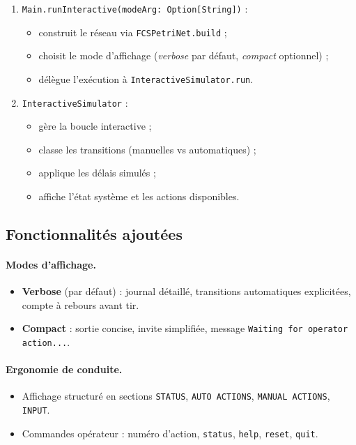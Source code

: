 \documentclass[11pt,a4paper]{article}
\newcommand{\code}[1]{\texttt{#1}}
\begin{document}
\begin{enumerate}[leftmargin=1.2cm,itemsep=2pt]
  \item \code{Main.runInteractive(modeArg: Option[String])} :
  \begin{itemize}[leftmargin=1.0cm,itemsep=1pt]
    \item construit le réseau via \code{FCSPetriNet.build} ;
    \item choisit le mode d'affichage (\emph{verbose} par défaut,
          \emph{compact} optionnel) ;
    \item délègue l'exécution à \code{InteractiveSimulator.run}.
  \end{itemize}
  \item \code{InteractiveSimulator} :
  \begin{itemize}[leftmargin=1.0cm,itemsep=1pt]
    \item gère la boucle interactive ;
    \item classe les transitions (manuelles vs automatiques) ;
    \item applique les délais simulés ;
    \item affiche l'état système et les actions disponibles.
  \end{itemize}
\end{enumerate}

\subsection{Fonctionnalités ajoutées}

\paragraph{Modes d'affichage.}
\begin{itemize}[leftmargin=1.2cm,itemsep=1pt]
  \item \textbf{Verbose} (par défaut) : journal détaillé, transitions
        automatiques explicitées, compte à rebours avant tir.
  \item \textbf{Compact} : sortie concise, invite simplifiée, message
        \code{Waiting for operator action...}.
\end{itemize}

\paragraph{Ergonomie de conduite.}
\begin{itemize}[leftmargin=1.2cm,itemsep=1pt]
  \item Affichage structuré en sections \code{STATUS}, \code{AUTO ACTIONS},
        \code{MANUAL ACTIONS}, \code{INPUT}.
  \item Commandes opérateur : numéro d'action, \code{status}, \code{help},
        \code{reset}, \code{quit}.
\end{itemize}
\end{document}
